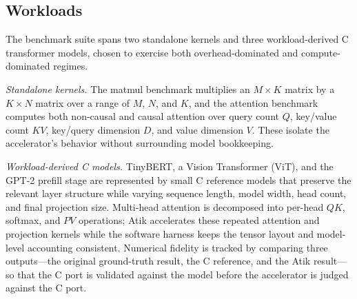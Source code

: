 \documentclass[sigconf,nonacm]{acmart}
\begin{document}
\subsection{Workloads}
The benchmark suite spans two standalone kernels and three workload-derived C
transformer models, chosen to exercise both overhead-dominated and
compute-dominated regimes.

\emph{Standalone kernels.} The matmul benchmark multiplies an $M\times K$
matrix by a $K\times N$ matrix over a range of $M$, $N$, and $K$, and the attention
benchmark computes both non-causal and causal attention over query count $Q$,
key/value count $KV$, key/query dimension $D$, and value dimension $V$. These
isolate the accelerator's behavior without surrounding model bookkeeping.

\emph{Workload-derived C models.} TinyBERT, a Vision Transformer (ViT), and the
GPT-2 prefill stage are represented by small C reference models that preserve
the relevant layer structure while varying sequence length, model width, head
count, and final projection size. Multi-head attention is
decomposed into per-head $QK$, softmax, and $PV$ operations; Atik accelerates
these repeated attention and projection kernels while the software harness keeps
the tensor layout and model-level accounting consistent. Numerical fidelity is
tracked by comparing three outputs---the original ground-truth result, the C
reference, and the Atik result---so that the C port is validated against the
model before the accelerator is judged against the C port.
\end{document}
